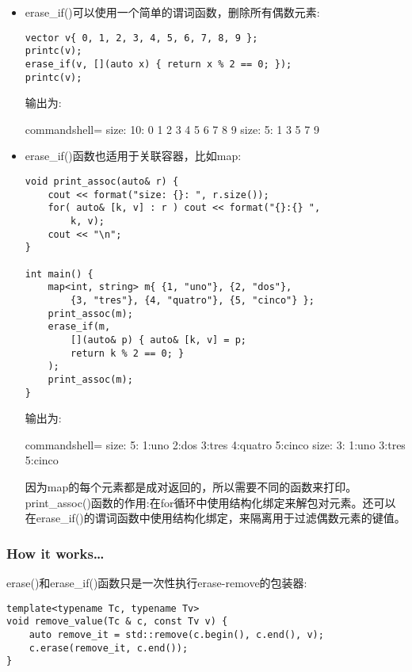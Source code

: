 \begin{itemize}
\item 
erase\_if()可以使用一个简单的谓词函数，删除所有偶数元素:

\begin{lstlisting}[style=styleCXX]
vector v{ 0, 1, 2, 3, 4, 5, 6, 7, 8, 9 };
printc(v);
erase_if(v, [](auto x) { return x % 2 == 0; });
printc(v);
\end{lstlisting}

输出为:

\begin{tcblisting}{commandshell={}}
size: 10: 0 1 2 3 4 5 6 7 8 9
size: 5: 1 3 5 7 9
\end{tcblisting}

\item 
erase\_if()函数也适用于关联容器，比如map:

\begin{lstlisting}[style=styleCXX]
void print_assoc(auto& r) {
	cout << format("size: {}: ", r.size());
	for( auto& [k, v] : r ) cout << format("{}:{} ",
		k, v);
	cout << "\n";
}

int main() {
	map<int, string> m{ {1, "uno"}, {2, "dos"},
		{3, "tres"}, {4, "quatro"}, {5, "cinco"} };
	print_assoc(m);
	erase_if(m,
		[](auto& p) { auto& [k, v] = p;
		return k % 2 == 0; }
	);
	print_assoc(m);
}
\end{lstlisting}

输出为:

\begin{tcblisting}{commandshell={}}
size: 5: 1:uno 2:dos 3:tres 4:quatro 5:cinco
size: 3: 1:uno 3:tres 5:cinco
\end{tcblisting}

因为map的每个元素都是成对返回的，所以需要不同的函数来打印。print\_assoc()函数的作用:在for循环中使用结构化绑定来解包对元素。还可以在erase\_if()的谓词函数中使用结构化绑定，来隔离用于过滤偶数元素的键值。
\end{itemize}

\subsubsection{How it works…}

erase()和erase\_if()函数只是一次性执行erase-remove的包装器:

\begin{lstlisting}[style=styleCXX]
template<typename Tc, typename Tv>
void remove_value(Tc & c, const Tv v) {
	auto remove_it = std::remove(c.begin(), c.end(), v);
	c.erase(remove_it, c.end());
}
\end{lstlisting}

